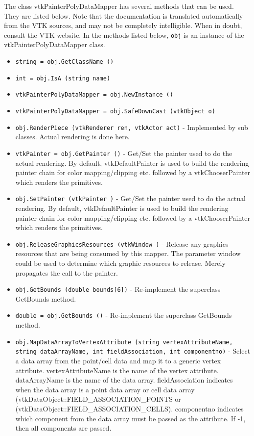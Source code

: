 The class vtkPainterPolyDataMapper has several methods that can be used.
  They are listed below.
Note that the documentation is translated automatically from the VTK sources,
and may not be completely intelligible.  When in doubt, consult the VTK website.
In the methods listed below, \verb|obj| is an instance of the vtkPainterPolyDataMapper class.
\begin{itemize}
\item  \verb|string = obj.GetClassName ()|

\item  \verb|int = obj.IsA (string name)|

\item  \verb|vtkPainterPolyDataMapper = obj.NewInstance ()|

\item  \verb|vtkPainterPolyDataMapper = obj.SafeDownCast (vtkObject o)|

\item  \verb|obj.RenderPiece (vtkRenderer ren, vtkActor act)| -  Implemented by sub classes. Actual rendering is done here.

\item  \verb|vtkPainter = obj.GetPainter ()| -  Get/Set the painter used to do the actual rendering.
 By default, vtkDefaultPainter is used to build the rendering 
 painter chain for color mapping/clipping etc. followed by 
 a vtkChooserPainter which renders the primitives.

\item  \verb|obj.SetPainter (vtkPainter )| -  Get/Set the painter used to do the actual rendering.
 By default, vtkDefaultPainter is used to build the rendering 
 painter chain for color mapping/clipping etc. followed by 
 a vtkChooserPainter which renders the primitives.

\item  \verb|obj.ReleaseGraphicsResources (vtkWindow )| -  Release any graphics resources that are being consumed by this mapper.
 The parameter window could be used to determine which graphic
 resources to release. Merely propagates the call to the painter.

\item  \verb|obj.GetBounds (double bounds[6])| -  Re-implement the superclass GetBounds method.

\item  \verb|double = obj.GetBounds ()| -  Re-implement the superclass GetBounds method.

\item  \verb|obj.MapDataArrayToVertexAttribute (string vertexAttributeName, string dataArrayName, int fieldAssociation, int componentno)| -  Select a data array from the point/cell data
 and map it to a generic vertex attribute. 
 vertexAttributeName is the name of the vertex attribute.
 dataArrayName is the name of the data array.
 fieldAssociation indicates when the data array is a point data array or
 cell data array (vtkDataObject::FIELD\_ASSOCIATION\_POINTS or
 (vtkDataObject::FIELD\_ASSOCIATION\_CELLS).
 componentno indicates which component from the data array must be passed as
 the attribute. If -1, then all components are passed.


\end{itemize}
